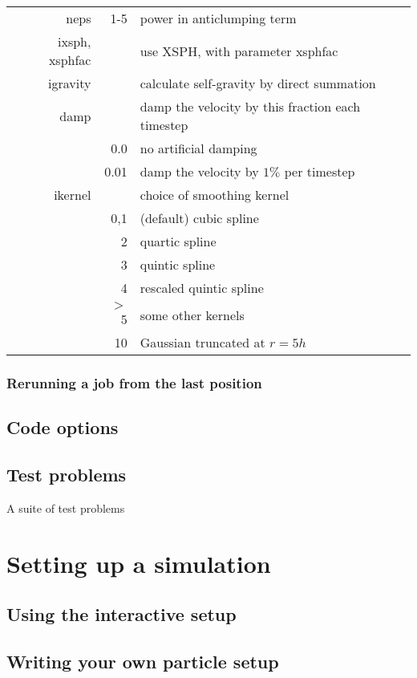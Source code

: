\documentclass[a4paper,12pt]{article}
\begin{document}
\begin{table}[!h]
\begin{tabular}{rrp{}}
neps      & 1-5 & power in anticlumping term \\
ixsph, xsphfac & & use XSPH, with parameter xsphfac \\
igravity  & & calculate self-gravity by direct summation \\
damp      & & damp the velocity by this fraction each timestep \\
          & 0.0 & no artificial damping  \\
	  & 0.01 & damp the velocity by $1\%$ per timestep \\
ikernel   & & choice of smoothing kernel \\
          & 0,1 & (default) cubic spline \\
	  & 2 & quartic spline \\
	  & 3 & quintic spline \\
	  & 4 & rescaled quintic spline \\
	  & $>$5 & some other kernels \\
	  & 10 & Gaussian truncated at $r=5h$ \\	  
\hline
\end{tabular}
\end{table}
\subsubsection{Rerunning a job from the last position}

\subsection{Code options}

\subsection{Test problems}
 A suite of test problems

\section{Setting up a simulation}

\subsection{Using the interactive setup}

\subsection{Writing your own particle setup}
\end{document}
